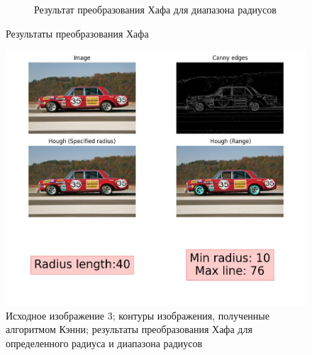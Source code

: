 \begin{figure}
\begin{subfigure}[b]{0.4\textwidth}
        \caption{Результат преобразования Хафа для диапазона радиусов}
        \label{img:kan_r}
    \end{subfigure}
        \caption{Результаты преобразования Хафа}
       \label{img::kan_comp}
\end{figure}

\begin{figure}[ht!]
    \centering
    \includegraphics[width=\textwidth]{images/circles/Mercedes.jpg}
    \caption{Исходное изображение 3; контуры изображения, полученные алгоритмом Кэнни; результаты преобразования Хафа для определенного радиуса и диапазона радиусов}
    \label{img:mr_fin}
\end{figure}

